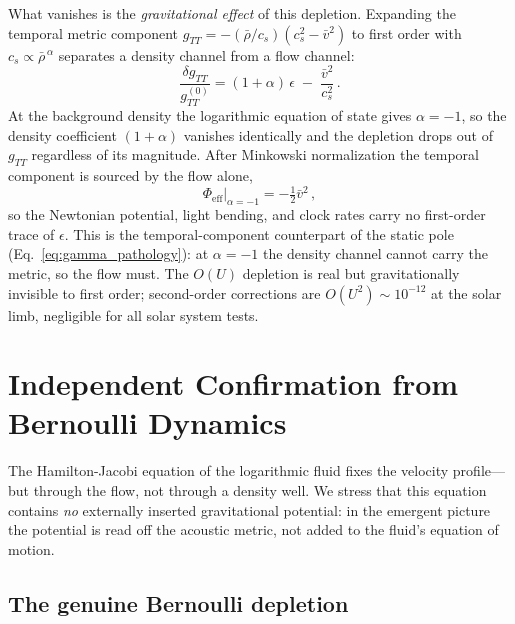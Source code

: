 \documentclass[12pt, a4paper]{article}
\newcommand{\rhob}{\bar{\rho}}
\newcommand{\vb}{\bar{v}}
\newcommand{\Phieff}{\Phi_{\mathrm{eff}}}
\begin{document}
What vanishes is the \emph{gravitational effect} of this depletion. Expanding the temporal metric component $g_{TT} = -(\rhob/c_s)(c_s^2 - \vb^2)$ to first order with $c_s \propto \rhob^{\,\alpha}$ separates a density channel from a flow channel:
\begin{equation}
    \frac{\delta g_{TT}}{g_{TT}^{(0)}} = (1+\alpha)\,\epsilon \;-\; \frac{\vb^2}{c_s^2}\,.
\label{eq:gtt_two_channel}
\end{equation}
At the background density the logarithmic equation of state gives $\alpha = -1$, so the density coefficient $(1+\alpha)$ vanishes identically and the depletion drops out of $g_{TT}$ regardless of its magnitude. After Minkowski normalization the temporal component is sourced by the flow alone,
\begin{equation}
    \Phieff\big|_{\alpha=-1} = -\tfrac{1}{2}\vb^2\,,
\label{eq:phi_eff_flow}
\end{equation}
so the Newtonian potential, light bending, and clock rates carry no first-order trace of $\epsilon$. This is the temporal-component counterpart of the static pole (Eq.~\ref{eq:gamma_pathology}): at $\alpha = -1$ the density channel cannot carry the metric, so the flow must. The $O(U)$ depletion is real but gravitationally invisible to first order; second-order corrections are $O(U^2) \sim 10^{-12}$ at the solar limb, negligible for all solar system tests.


\section{Independent Confirmation from Bernoulli Dynamics}
\label{sec:bernoulli}

The Hamilton-Jacobi equation of the logarithmic fluid fixes the velocity profile---but through the flow, not through a density well. We stress that this equation contains \emph{no} externally inserted gravitational potential: in the emergent picture the potential is read off the acoustic metric, not added to the fluid's equation of motion.

\subsection{The genuine Bernoulli depletion}
\end{document}
